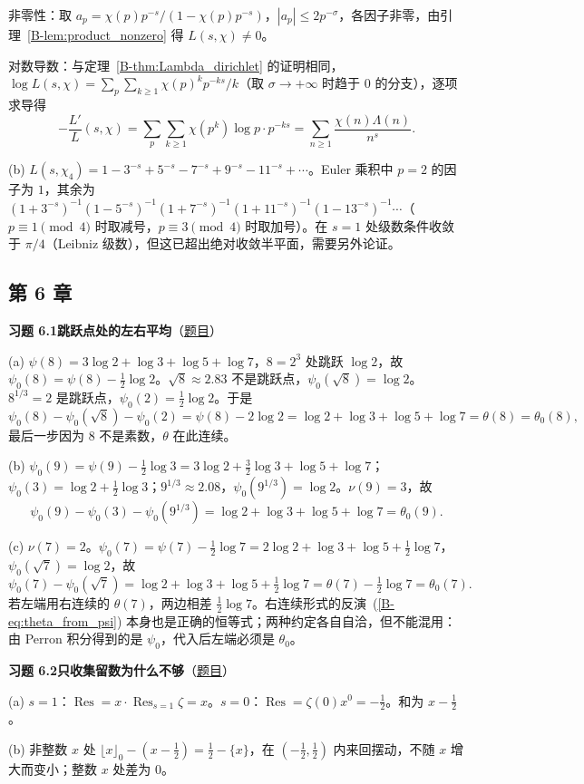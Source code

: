 \documentclass[11pt,a4paper]{article}
\DeclareMathOperator{\Res}{Res}
\newcommand{\bref}[1]{\ref*{B-#1}}
\newcommand{\Sol}[2]{%
  \par\addvspace{1.2em}\noindent
  \hypertarget{s:#1}{}\textbf{习题 #1\quad #2}\hfill{\small（\hyperlink{q:#1}{题目}）}\par
  \nopagebreak\smallskip}
\begin{document}
非零性：取 $a_p=\chi(p)p^{-s}/(1-\chi(p)p^{-s})$，$|a_p|\le2p^{-\sigma}$，各因子非零，由引理~\bref{lem:product_nonzero} 得 $L(s,\chi)\ne0$。

对数导数：与定理~\bref{thm:Lambda_dirichlet} 的证明相同，$\log L(s,\chi)=\sum_p\sum_{k\ge1}\chi(p)^kp^{-ks}/k$（取 $\sigma\to+\infty$ 时趋于 $0$ 的分支），逐项求导得
\[
  -\frac{L'}{L}(s,\chi)=\sum_p\sum_{k\ge1}\chi(p^k)\log p\cdot p^{-ks}=\sum_{n\ge1}\frac{\chi(n)\Lambda(n)}{n^s}.
\]

(b) $L(s,\chi_4)=1-3^{-s}+5^{-s}-7^{-s}+9^{-s}-11^{-s}+\cdots$。Euler 乘积中 $p=2$ 的因子为 $1$，其余为 $(1+3^{-s})^{-1}(1-5^{-s})^{-1}(1+7^{-s})^{-1}(1+11^{-s})^{-1}(1-13^{-s})^{-1}\cdots$（$p\equiv1\pmod4$ 时取减号，$p\equiv3\pmod4$ 时取加号）。在 $s=1$ 处级数条件收敛于 $\pi/4$（Leibniz 级数），但这已超出绝对收敛半平面，需要另外论证。

\subsection*{第 6 章}

\Sol{6.1}{跳跃点处的左右平均}
(a) $\psi(8)=3\log2+\log3+\log5+\log7$，$8=2^3$ 处跳跃 $\log2$，故 $\psi_0(8)=\psi(8)-\tfrac12\log2$。$\sqrt8\approx2.83$ 不是跳跃点，$\psi_0(\sqrt8)=\log2$。$8^{1/3}=2$ 是跳跃点，$\psi_0(2)=\tfrac12\log2$。于是
\[
  \psi_0(8)-\psi_0(\sqrt8)-\psi_0(2)=\psi(8)-2\log2=\log2+\log3+\log5+\log7=\theta(8)=\theta_0(8),
\]
最后一步因为 $8$ 不是素数，$\theta$ 在此连续。

(b) $\psi_0(9)=\psi(9)-\tfrac12\log3=3\log2+\tfrac32\log3+\log5+\log7$；$\psi_0(3)=\log2+\tfrac12\log3$；$9^{1/3}\approx2.08$，$\psi_0(9^{1/3})=\log2$。$\nu(9)=3$，故
\[
  \psi_0(9)-\psi_0(3)-\psi_0(9^{1/3})=\log2+\log3+\log5+\log7=\theta_0(9).
\]

(c) $\nu(7)=2$。$\psi_0(7)=\psi(7)-\tfrac12\log7=2\log2+\log3+\log5+\tfrac12\log7$，$\psi_0(\sqrt7)=\log2$，故
\[
  \psi_0(7)-\psi_0(\sqrt7)=\log2+\log3+\log5+\tfrac12\log7=\theta(7)-\tfrac12\log7=\theta_0(7).
\]
若左端用右连续的 $\theta(7)$，两边相差 $\tfrac12\log7$。右连续形式的反演~(\bref{eq:theta_from_psi}) 本身也是正确的恒等式；两种约定各自自洽，但不能混用：由 Perron 积分得到的是 $\psi_0$，代入后左端必须是 $\theta_0$。

\Sol{6.2}{只收集留数为什么不够}
(a) $s=1$：$\Res=x\cdot\Res_{s=1}\zeta=x$。$s=0$：$\Res=\zeta(0)x^0=-\tfrac12$。和为 $x-\tfrac12$。

(b) 非整数 $x$ 处 $\lfloor x\rfloor_0-(x-\tfrac12)=\tfrac12-\{x\}$，在 $(-\tfrac12,\tfrac12)$ 内来回摆动，不随 $x$ 增大而变小；整数 $x$ 处差为 $0$。
\end{document}
